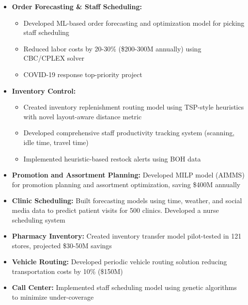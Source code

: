 \documentclass[12pt,a4paper,sans]{moderncv}
\begin{document}
{
    \begin{itemize}
        \item \textbf{Order Forecasting \& Staff Scheduling:}
        \begin{itemize}
            \item Developed ML-based order forecasting and optimization model for picking staff scheduling
            \item Reduced labor costs by 20-30\% (\$200-300M annually) using CBC/CPLEX solver
            \item COVID-19 response top-priority project
        \end{itemize}
        \item \textbf{Inventory Control:}
        \begin{itemize}
            \item Created inventory replenishment routing model using TSP-style heuristics with novel layout-aware distance metric
            \item Developed comprehensive staff productivity tracking system (scanning, idle time, travel time)
            \item Implemented heuristic-based restock alerts using BOH data
        \end{itemize}
    \end{itemize}
}

{
    \begin{itemize}
        \item \textbf{Promotion and Assortment Planning:} Developed MILP model (AIMMS) for promotion planning and assortment optimization, saving \$400M annually
        \item \textbf{Clinic Scheduling:} Built forecasting models using time, weather, and social media data to predict patient visits for 500 clinics. Developed a nurse scheduling system
        \item \textbf{Pharmacy Inventory:} Created inventory transfer model pilot-tested in 121 stores, projected \$30-50M savings
        \item \textbf{Vehicle Routing:} Developed periodic vehicle routing solution reducing transportation costs by 10\% (\$150M)
        \item \textbf{Call Center:} Implemented staff scheduling model using genetic algorithms to minimize under-coverage
    \end{itemize}
}
\end{document}
